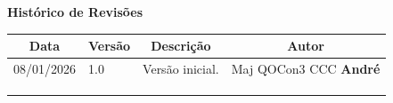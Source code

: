 \begin{table}[h]
	\begin{center}
	    \textbf{\Huge{Histórico de Revisões}}
	\end{center}
    \centering
	\begin{tabular}{|p{3cm}|p{1.5cm}|p{7.5cm}|p{3.2cm}|}
		\hline \multicolumn{1}{|c|}{\textbf{Data}} & \multicolumn{1}{|c|}{\textbf{Versão}} &
			\multicolumn{1}{|c|}{\textbf{Descrição}} & \multicolumn{1}{|c|}{\textbf{Autor}} \\ \hline
		08/01/2026 & 1.0 & Versão inicial. & Maj QOCon3 CCC \textbf{André} \\ \hline
		& & & \\ \hline
		& & & \\ \hline
		& & & \\ \hline
	\end{tabular}
\end{table}